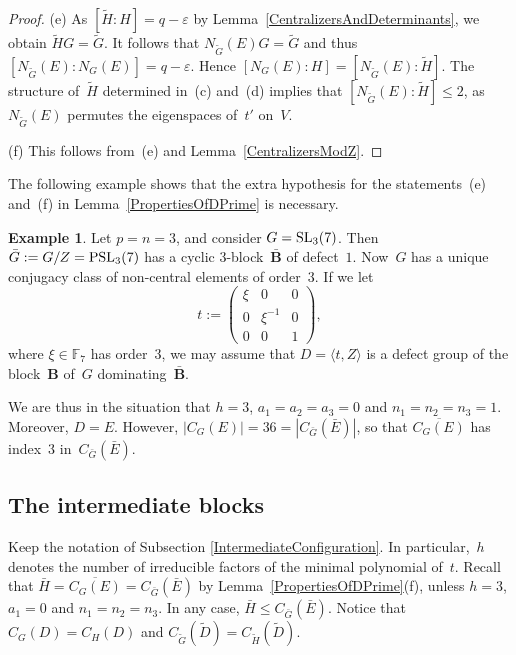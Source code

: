 \documentclass[12pt]{amsart}
\newcommand{\bB}{{\mathbf{B}}}
\def\SL{ \text{\rm SL} }
\def\PSL{ \text{\rm PSL} }
\theoremstyle{theorem}
\theoremstyle{definition}
\newtheorem{exmp}[thm]{Example}
\theoremstyle{remark}
\begin{document}
\begin{proof}
(e) As $[\tilde{H}\colon\!H] = q - \varepsilon$ by
Lemma~\ref{CentralizersAndDeterminants}, we obtain $\tilde{H}G = \tilde{G}$.
It follows that $N_{\tilde{G}}( E )G = \tilde{G}$ and thus
$[N_{\tilde{G}}( E )\colon\!N_G( E )] = q - \varepsilon$.
Hence
$[N_G( E )\colon\!H] = [N_{\tilde{G}}( E )\colon\!\tilde{H}]$.
The structure of~$\tilde{H}$ determined in~(c) and~(d) implies that
$[N_{\tilde{G}}( E )\colon\!\tilde{H}] \leq 2$, as $N_{\tilde{G}}( E )$
permutes the eigen\-spac\-es of~$t'$ on~$V$. 

(f) This follows from~(e) and Lemma~\ref{CentralizersModZ}.
\end{proof}

The following example shows that the extra hypothesis for the statements~(e) 
and~(f) in Lemma~\ref{PropertiesOfDPrime} is necessary.

\begin{exmp}
{\rm Let $p = n = 3$, and consider $G = \SL_3( 7 )$. Then 
$\bar{G} := G/Z = \PSL_3( 7 )$ has a cyclic $3$-block~$\bar{\bB}$ of defect~$1$.
Now~$G$ has a unique conjugacy class of non-central elements of order~$3$. If we 
let 
$$
t := \left( 
       \begin{array}{ccc} \xi & 0 & 0 \\ 0 & \xi^{-1} & 0 \\ 0 & 0 & 1 \end{array}
       \right),
$$
where $\xi \in \mathbb{F}_7$ has order~$3$, we may assume that 
$D = \langle t, Z \rangle$ is a defect group of the block~$\bB$ of~$G$ 
dominating~$\bar{\bB}$.

We are thus in the situation that $h = 3$, $a_1 = a_2 = a_3 = 0$ and 
$n_1 = n_2 = n_3 = 1$. Moreover, $D = E$. However, $|C_G( E )| = 36 = 
|C_{\bar{G}}( \bar{E} )|$, so that $\overline{C_G( E )}$ has index~$3$
in~$C_{\bar{G}}( \bar{E} )$.
}\hfill{\textsquare}
\end{exmp}

\addtocounter{subsection}{3}
\subsection{The intermediate blocks}
Keep the notation of Subsection \ref{IntermediateConfiguration}. In 
particular,~$h$ denotes the number of irreducible factors of the minimal
polynomial of~$t$. Recall that 
$\bar{H} = \overline{C_{G}( E )} = C_{\bar{G}}( \bar{E} )$ by 
Lemma~\ref{PropertiesOfDPrime}(f), unless $h = 3$, $a_1 = 0$ and 
$n_1 = n_2 = n_3$. In any case, $\bar{H} \leq C_{\bar{G}}( \bar{E} )$. Notice 
that $C_G( D ) = C_H( D )$ and 
$C_{\tilde{G}}( \tilde{D} ) = C_{\tilde{H}}( \tilde{D} ) $.
\end{document}

